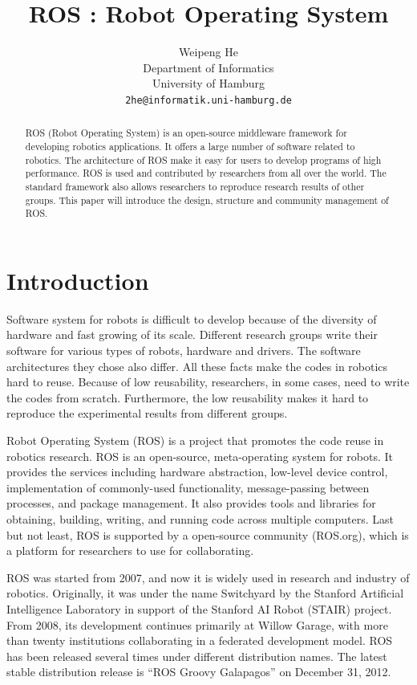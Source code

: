 \documentclass[a4paper, 10pt, conference]{ieeeconf}       %
\title{\LARGE \bf
  ROS : Robot Operating System
}
\author{
  Weipeng He
\\ Department of Informatics\\ University of Hamburg \\ {\tt\small 2he@informatik.uni-hamburg.de}
}
\begin{document}
\maketitle
\thispagestyle{empty}
\pagestyle{empty}

\begin{abstract}
  ROS (Robot Operating System) is an open-source middleware framework for developing robotics applications. It offers a large number of software related to robotics. The architecture of ROS make it easy for users to develop programs of high performance. ROS is used and contributed by researchers from all over the world. The standard framework also allows researchers to reproduce research results of other groups. This paper will introduce the design, structure and community management of ROS.
\end{abstract}


\section{Introduction}

Software system for robots is difficult to develop because of the diversity of hardware and fast growing of its scale. Different research groups write their software for various types of robots, hardware and drivers. The software architectures they chose also differ. All these facts make the codes in robotics hard to reuse. Because of low reusability, researchers, in some cases, need to write the codes from scratch. Furthermore, the low reusability makes it hard to reproduce the experimental results from different groups.

Robot Operating System (ROS) is a project that promotes the code reuse in robotics research\cite{quigley_ros:_2009}. ROS is an open-source, meta-operating system for robots. It provides the services including hardware abstraction, low-level device control, implementation of commonly-used functionality, message-passing between processes, and package management. It also provides tools and libraries for obtaining, building, writing, and running code across multiple computers. Last but not least, ROS is supported by a open-source community (ROS.org), which is a platform for researchers to use for collaborating.

ROS was started from 2007, and now it is widely used in research and industry of robotics. Originally, it was under the name Switchyard by the Stanford Artificial Intelligence Laboratory in support of the Stanford AI Robot (STAIR) project. From 2008, its development continues primarily at Willow Garage, with more than twenty institutions collaborating in a federated development model. ROS has been released several times under different distribution names. The latest stable distribution release is ``ROS Groovy Galapagos'' on December 31, 2012\cite{_documentation_2013}.
\end{document}
